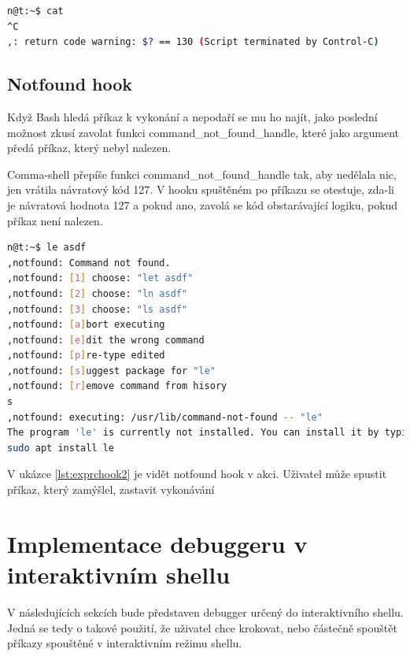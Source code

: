 \documentclass[thesis=M,czech]{FITthesis}[2012/06/26]
\begin{document}
\begin{minipage}{\linewidth}
\begin{lstlisting}[language=bash, caption={Explain RC hook}, label={lst:exprchook2}]
n@t:~$ cat
^C
,: return code warning: $? == 130 (Script terminated by Control-C)
\end{lstlisting}
\end{minipage}


\subsection{Notfound hook}

Když Bash hledá příkaz k vykonání a nepodaří se mu ho najít, jako poslední možnost zkusí zavolat funkci command\_not\_found\_handle, které jako argument předá příkaz, který nebyl nalezen.

Comma-shell přepíše funkci command\_not\_found\_handle tak, aby nedělala nic, jen vrátila návratový kód 127. V hooku spuštěném po příkazu se otestuje, zda-li je návratová hodnota 127 a pokud ano, zavolá se kód obstarávající logiku, pokud příkaz není nalezen.

\begin{minipage}{\linewidth}
\begin{lstlisting}[language=bash, caption={Explain RC hook}, label={lst:exprchook2}]
n@t:~$ le asdf
,notfound: Command not found.
,notfound: [1] choose: "let asdf"
,notfound: [2] choose: "ln asdf"
,notfound: [3] choose: "ls asdf"
,notfound: [a]bort executing
,notfound: [e]dit the wrong command
,notfound: [p]re-type edited
,notfound: [s]uggest package for "le"
,notfound: [r]emove command from hisory
s
,notfound: executing: /usr/lib/command-not-found -- "le"
The program 'le' is currently not installed. You can install it by typing:
sudo apt install le
\end{lstlisting}
\end{minipage}

V ukázce \ref{lst:exprchook2} je vidět notfound hook v akci. Uživatel může spustit příkaz, který zamýšlel, zastavit vykonávání

%
%
%
%
%
\section{Implementace debuggeru v interaktivním shellu}

V následujících sekcích bude představen debugger určený do interaktivního shellu. Jedná se tedy o takové použití, že uživatel chce krokovat, nebo částečně spouštět příkazy spouštěné v interaktivním režimu shellu.
\end{document}

